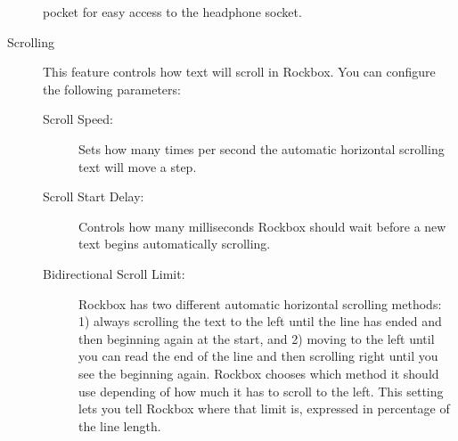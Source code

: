 \begin{description}
{\begin{description}
         pocket for easy access to the headphone socket.
    \end{description}
  }
%
  \item[Scrolling]
    This feature controls how text will scroll in Rockbox. You can configure
    the following parameters:
    \begin{description}
    \item[Scroll Speed:]
      Sets how many times per second the automatic horizontal scrolling text 
      will move a step.
    \item[Scroll Start Delay:]
      Controls how many milliseconds Rockbox should wait before a new
      text begins automatically scrolling.
    \item[Bidirectional Scroll Limit:]
      Rockbox has two different automatic horizontal scrolling methods: 1) always
      scrolling the text to the left until the line has ended and then beginning
      again at the start, and 2) moving to the left until you can read the end of
      the line and then scrolling right until you see the beginning again.
      Rockbox chooses which method it should use depending of how much it has to
      scroll to the left. This setting lets you tell Rockbox where that limit
      is, expressed in percentage of the line length.
\end{description}
\end{description}
